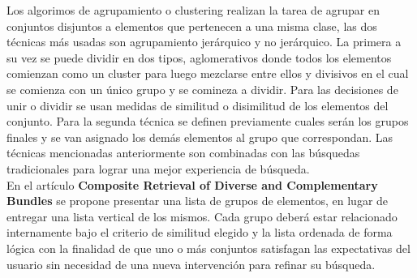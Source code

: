 Los algorimos de agrupamiento o clustering realizan la tarea de agrupar en conjuntos disjuntos a elementos que pertenecen a una misma clase, las dos técnicas más usadas son agrupamiento jerárquico y no jerárquico. La primera a su vez se puede dividir en dos tipos, aglomerativos donde todos los elementos comienzan como un cluster para luego mezclarse entre ellos y divisivos en el cual se comienza con un único grupo y se comineza a dividir. Para las decisiones de unir o dividir se usan medidas de similitud o disimilitud de los elementos del conjunto. Para la segunda técnica se definen previamente cuales serán los grupos finales y se van asignado los demás elementos al grupo que correspondan. Las técnicas mencionadas anteriormente son combinadas con las búsquedas tradicionales para lograr una mejor experiencia de búsqueda.\\
En el  artículo \textbf{Composite Retrieval of Diverse and Complementary Bundles}\cite{compositeRetrival} se propone presentar una lista de grupos de elementos, en lugar de entregar una lista vertical de los mismos. Cada grupo deberá estar relacionado internamente bajo el criterio de similitud elegido y la lista ordenada de forma lógica con la finalidad de que uno o más conjuntos satisfagan las expectativas del usuario sin necesidad de una nueva intervención para refinar su búsqueda.

